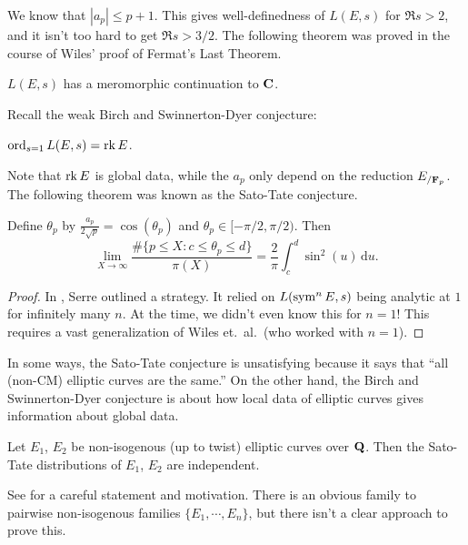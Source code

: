 We know that $|a_p|\leqslant p+1$. This gives well-definedness of $L(E,s)$ for 
$\Re s>2$, and it isn't too hard to get $\Re s>3/2$. The following theorem was 
proved in the course of Wiles' proof of Fermat's Last Theorem. 

\begin{theorem}
$L(E,s)$ has a meromorphic continuation to $\mathbf{C}$. 
\end{theorem}

Recall the weak Birch and Swinnerton-Dyer conjecture:

\begin{conjecture}
$\operatorname{ord}_{s=1} L(E,s) = \operatorname{rk} E$. 
\end{conjecture}
Note that $\operatorname{rk} E$ is global data, while the $a_p$ only depend on the reduction 
$E_{/\mathbf{F}_p}$. The following theorem was known as the Sato-Tate conjecture. 

\begin{theorem}[Taylor et.~al.]
Define $\theta_p$ by $\frac{a_p}{2\sqrt p} = \cos(\theta_p)$ and 
$\theta_p\in [-\pi/2,\pi/2)$. Then 
\[
  \lim_{X\to \infty}\frac{\#\{p\leqslant X:c\leqslant \theta_p\leqslant d\}}{\pi(X)} = \frac 2 \pi \int_c^d \sin^2(u)\, \mathrm{d} u .
\]
\end{theorem}
\begin{proof}
In \cite{serre-1968}, Serre outlined a strategy. It relied on 
$L(\operatorname{sym}^n E,s)$ being analytic at $1$ for infinitely many $n$. At the 
time, we didn't even know this for $n=1$! This requires a vast generalization 
of Wiles et.~al.~(who worked with $n=1$). 
\end{proof}

In some ways, the Sato-Tate conjecture is unsatisfying because it says that 
``all (non-CM) elliptic curves are the same.'' On the other hand, the Birch and 
Swinnerton-Dyer conjecture is about how local data of elliptic curves gives 
information about global data. 

\begin{conjecture}[Harris]
Let $E_1$, $E_2$ be non-isogenous (up to twist) elliptic curves over $\mathbf{Q}$. 
Then the Sato-Tate distributions of $E_1$, $E_2$ are independent. 
\end{conjecture}

See \cite{harris-ST} for a careful statement and motivation. 
There is an obvious family to pairwise non-isogenous families 
$\{E_1,\cdots,E_n\}$, but there isn't a clear approach to prove this. 





